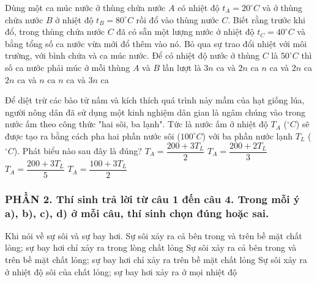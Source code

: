\begin{ex}%
	Dùng một ca múc nước ở thùng chứa nước $A$ có nhiệt độ $t_A = 20^\circ C$ và ở thùng chứa nước $B$ ở nhiệt độ $t_B = 80^\circ C$ rồi đổ vào thùng nước $C$. Biết rằng trước khi đổ, trong thùng chứa nước $C$ đã có sẵn một lượng nước ở nhiệt độ $t_C = 40^\circ C$ và bằng tổng số ca nước vừa mới đổ thêm vào nó. Bỏ qua sự trao đổi nhiệt với môi trường, với bình chứa và ca múc nước. Để có nhiệt độ nước ở thùng $C$ là $50^\circ C$ thì số ca nước phải múc ở mỗi thùng $A$ và $B$ lần lượt là
	\choice
	{$3 n$ ca và $2 n$ ca}
	{\True $n$ ca và $2 n$ ca}
	{$2 n$ ca và $n$ ca}
	{$n$ ca và $3 n$ ca}
\end{ex}
\begin{ex}%
	Để diệt trừ các bào tử nấm và kích thích quá trình nảy mầm của hạt giống lúa, người nông dân đã sử dụng một kinh nghiệm dân gian là ngâm chúng vào trong nước ấm theo công thức "hai sôi, ba lạnh". Tức là nước ấm ở nhiệt độ $T_A$ ($^\circ C$) sẽ được tạo ra bằng cách pha hai phần nước sôi ($100^\circ C$) với ba phần nước lạnh $T_L$ ($^\circ C$). Phát biểu nào sau đây là đúng?
	\choice
	{ $T_A = \dfrac{200+3T_L}{2}$ }
	{ $T_A = \dfrac{200+2T_L}{3}$ }
	{\True $T_A = \dfrac{200+3T_L}{5}$ }
	{ $T_A = \dfrac{100+3T_L}{2}$ }
\end{ex}
\subsubsection*{PHẦN 2. Thí sinh trả lời từ câu 1 đến câu 4. Trong mỗi ý a), b), c), d) ở mỗi câu, thí sinh chọn đúng hoặc sai.}
\setcounter{ex}{0}
\begin{ex}
	Khi nói về sự sôi và sự bay hơi.
	{Sự sôi xảy ra cả bên trong và trên bề mặt chất lỏng; sự bay hơi chỉ xảy ra trong lòng chất lỏng}
	{\True Sự sôi xảy ra cả bên trong và trên bề mặt chất lỏng; sự bay hơi chỉ xảy ra trên bề mặt chất lỏng}
	{\True Sự sôi xảy ra ở nhiệt độ sôi của chất lỏng; sự bay hơi xảy ra ở mọi nhiệt độ}
\end{ex}


